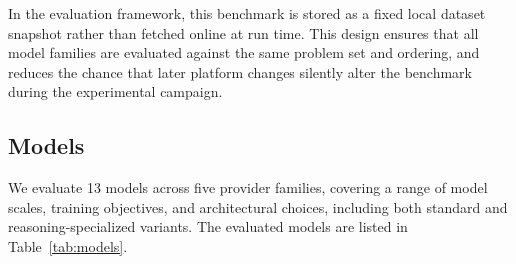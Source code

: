 \documentclass[11pt]{article}
\begin{document}
In the evaluation framework, this benchmark is stored as a fixed local dataset snapshot rather than fetched online at run time. This design ensures that all model families are evaluated against the same problem set and ordering, and reduces the chance that later platform changes silently alter the benchmark during the experimental campaign.

\subsection{Models}

We evaluate 13 models across five provider families, covering a range of model scales, training objectives, and architectural choices, including both standard and reasoning-specialized variants. The evaluated models are listed in Table~\ref{tab:models}.

\begin{table}[t]
\centering
\small
\caption{Models evaluated in this study, grouped by provider family. $\dagger$ denotes reasoning-specialized models.}
\label{tab:models}
\end{table}
\end{document}
